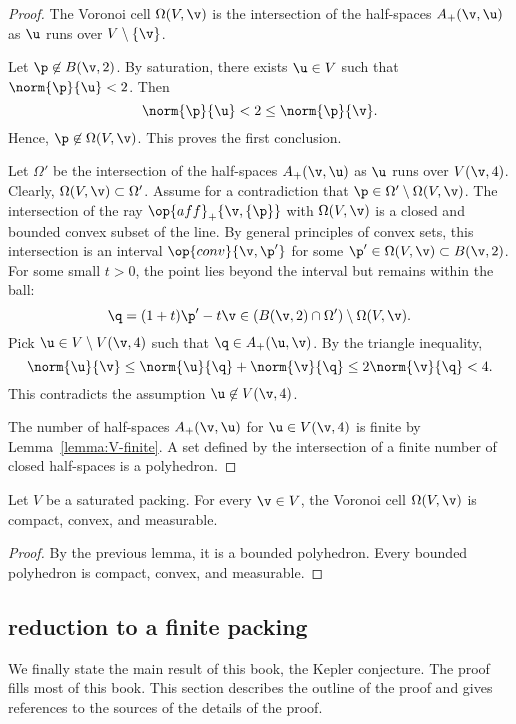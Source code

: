 \begin{proof} 
The Voronoi cell $\Omega(V,\v)$ is the
intersection of the half-spaces $A_+(\v,\u)$ as $\u$ runs over
$V\setminus \{\v\}$.

Let $\p\not\in B(\v,2)$.  
By saturation, there exists $\u\in V$ such that $\norm{\p}{\u}<2$.
Then 
\[  
\norm{\p}{\u} < 2 \le \norm{\p}{\v}.
\] 
Hence, $\p\not\in\Omega(V,\v)$.  This proves the first conclusion.


Let $\Omega'$ be the intersection of the half-spaces $A_+(\v,\u)$ as
$\u$ runs over $V(\v,4)$.  Clearly, $\Omega(V,\v)\subset \Omega'$.
Assume for a contradiction that $\p\in \Omega'\setminus\Omega(V,\v)$.
The intersection of the ray $\op{aff}_+\{\v,\{\p\}\}$ with
$\Omega(V,\v)$ is a closed and bounded convex subset of the line.  By
general principles of convex sets, this intersection is an interval
$\op{conv}\{\v,\p'\}$ for some $\p'\in\Omega(V,\v)\subset B(\v,2)$.
For some small $t>0$, the point lies beyond the interval but remains
within the ball:
\[  
\q = (1+t)\p' -t \v\in (B(\v,2)\cap \Omega')\setminus \Omega(V,\v).
\] 
Pick $\u\in V\setminus V(\v,4)$ such that $\q\in A_+(\u,\v)$.  By the
triangle inequality,
\[  
\norm{\u}{\v} \le \norm{\u}{\q} + \norm{\v}{\q} \le 2\norm{\v}{\q} < 4.
\] 
This contradicts the assumption $\u\not\in V(\v,4)$.

The number of half-spaces $A_+(\v,\u)$ for $\u\in V(\v,4)$ is finite by
Lemma~\ref{lemma:V-finite}.  A set defined by the intersection of a finite number
of closed half-spaces is a polyhedron.
\end{proof}

\begin{lemma}
Let $ V$ be a saturated packing.  For every $\v\in  V$, 
the Voronoi cell $\Omega( V,\v)$  is
compact, convex, and measurable.
\end{lemma}

\begin{proof}  By the previous lemma, it is a bounded polyhedron.  Every bounded
polyhedron is compact, convex, and measurable.
\end{proof}




\subsection{reduction to a finite packing}

We finally state the main result of this book, the Kepler conjecture.
The proof fills most of this book. This section describes the
outline of the proof and gives references to the sources of the
details of the proof.


